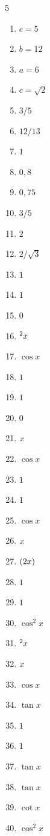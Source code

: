 \documentclass[letterpaper, 12pt]{article}
\let\sin\relax
\DeclareMathOperator{\sin}{sen}
\begin{document}
\begin{tcolorbox}[colback=celesteSuave, colframe=azulFuerte, title=\textbf{I - II. Fundamentos y Razones Trigonométricas}, fonttitle=\bfseries]
\begin{multicols}{5}
\begin{enumerate}[label=\color{azulFuerte}\bfseries\arabic*., leftmargin=*, noitemsep]
    \item $c=5$ \item $b=12$ \item $a=6$ \item $c=\sqrt{2}$ \item $3/5$ \item $12/13$ \item $1$ \item $0,8$ \item $0,75$ \item $3/5$ \item $2$ \item $2/\sqrt{3}$ \item $1$ \item $1$ \item $0$ \item $\sin^2 x$ \item $\cos x$ \item $1$ \item $1$ \item $0$ \item $\sin x$ \item $\cos x$ \item $1$ \item $1$ \item $\cos x$ \item $\sin x$ \item $\sin(2x)$ \item $1$ \item $1$ \item $\cos^2 x$ \item $\sin^2 x$ \item $\sin x$ \item $\cos x$ \item $\tan x$ \item $1$ \item $1$ \item $\tan x$ \item $\tan x$ \item $\cot x$ \item $\cos^2 x$
\end{enumerate}
\end{multicols}
\end{tcolorbox}
\end{document}
